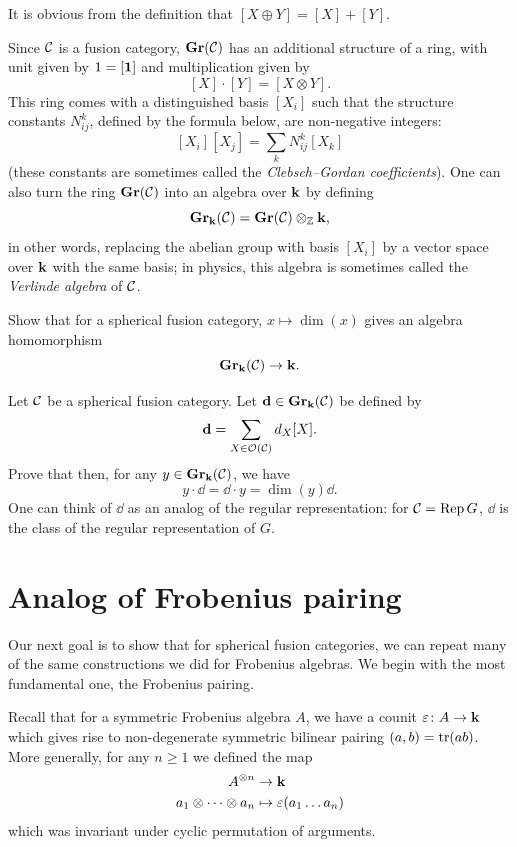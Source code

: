 It is obvious from the definition that $[X\oplus Y]=[X]+[Y]$.

Since $\mathcal{C}$ is a fusion category, $\mathbf{Gr}(\mathcal{C})$ has an additional structure of
a ring, with unit given by $1=[\mathbf{1}]$ and multiplication given by
$$
  [X]\cdot [Y]=[X\otimes Y].
$$
This ring comes with a distinguished basis $[X_i]$ such
that the structure constants $N_{ij}^k$, defined by the formula below, are
non-negative integers:
$$
  [X_i][X_j]=\sum_k N_{ij}^k [X_k]
$$
(these constants are sometimes called the \emph{Clebsch--Gordan coefficients}).
One can also turn the ring $\mathbf{Gr}(\mathcal{C})$ into an algebra over $\mathbf{k}$ by defining
$$
  \mathbf{Gr}_{\mathbf{k}}(\mathcal{C})=\mathbf{Gr}(\mathcal{C})\otimes_{\mathbb{Z}} \mathbf{k},
$$
in other words, replacing the abelian group with basis $[X_i]$ by a vector space
over $\mathbf{k}$ with the same basis; in physics, this algebra is sometimes called the
\emph{Verlinde algebra} of $\mathcal{C}$.

\begin{exercise}\label{ec:dim-hom}
  Show that for a spherical fusion category,
  $x\mapsto \dim (x)$ gives an algebra homomorphism
  $$
    \mathbf{Gr}_{\mathbf{k}}(\mathcal{C})\to \mathbf{k}.
  $$
\end{exercise}

\begin{exercise}\label{ec:virtual-regular}
  Let $\mathcal{C}$ be a spherical fusion category. Let
  $\mathbf{d} \in \mathbf{Gr}_{\mathbf{k}}(\mathcal{C})$ be defined by
  \begin{equation}\label{d:dd}
    \mathbf{d} = \sum_{X\in \mathcal{O}(\mathcal{C})}d_X [X].
  \end{equation}
  Prove that then, for any $y \in \mathbf{Gr}_{\mathbf{k}}(\mathcal{C})$, we have
  $$
    y \cdot \dd = \dd\cdot y = \dim(y) \dd.
  $$
  One can think of $\dd$ as an analog of the
  regular representation: for $\mathcal{C}=\operatorname{Rep} G$, $\dd$ is the class of the
  regular representation of $G$.
\end{exercise}



\section{Analog of Frobenius pairing}\label{s:cat-pairing}
Our next goal is to show that for spherical fusion categories, we can repeat
many of the same constructions we did for Frobenius algebras. We begin with the
most fundamental one, the Frobenius pairing.

Recall that for a symmetric Frobenius algebra $A$, we have a counit $\varepsilon\colon
A\to \mathbf{k}$ which gives rise to non-degenerate symmetric bilinear pairing
$(a,b)=\operatorname{tr}(ab)$. More generally, for any $n\ge 1$ we defined the map
\begin{align*} A^{\otimes n}&\to \mathbf{k}\\ a_1\otimes\dots\otimes a_n &\mapsto \varepsilon
(a_1\dots a_n) \end{align*} which was invariant under cyclic permutation of
arguments.

